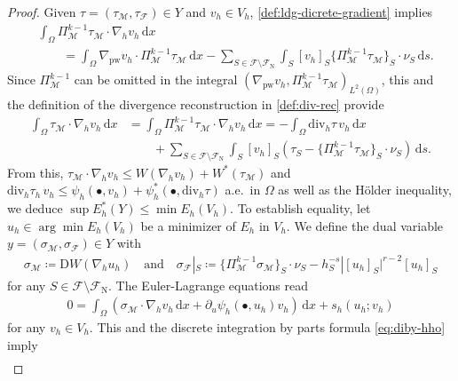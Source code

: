 \documentclass[10pt,a4paper]{amsart}
\newcommand{\D}{\mathrm{D}}
\newcommand{\Mcal}{\mathcal{M}}
\newcommand{\pw}{\mathrm{pw}}
\renewcommand{\div}{\mathrm{div}}
\renewcommand{\d}[1]{\,\mathrm{d}#1}
\begin{document}
\begin{proof}
	Given $\tau = (\tau_\Mcal, \tau_\mathcal{F}) \in Y$ and $v_h \in V_h$,
    \eqref{def:ldg-dicrete-gradient} implies
    \begin{align*}
        &\int_\Omega \Pi_\Mcal^{k-1} \tau_\Mcal \cdot \nabla_h v_h \d{x}\\
        &\qquad= \int_\Omega \nabla_\pw v_h \cdot \Pi_\Mcal^{k-1} \tau_\Mcal \d{x} - \sum_{S \in \mathcal{F}\setminus\mathcal{F}_\mathrm{N}} \int_S [v_h]_S \{\Pi_\Mcal^{k-1} \tau_\Mcal\}_S \cdot \nu_S \d{s}.
    \end{align*}
    Since $\Pi_\Mcal^{k-1}$ can be omitted in the integral $(\nabla_\pw v_h, \Pi_\Mcal^{k-1} \tau_\Mcal)_{L^2(\Omega)}$,
    this and the definition of the divergence reconstruction in \eqref{def:div-rec} provide
    \begin{align}\label{eq:diby-hho}
        \int_\Omega \tau_\Mcal \cdot \nabla_h v_h \d{x} &= \int_\Omega \Pi_\Mcal^{k-1} \tau_\Mcal \cdot \nabla_h v_h \d{x} = -\int_\Omega \div_h \tau \,v_h \d{x}\nonumber\\
		&\qquad+ \sum_{S \in \mathcal{F} \setminus \mathcal{F}_\mathrm{N}} \int_S [v_h]_S (\tau_S - \{\Pi_\Mcal^{k-1} \tau_\Mcal\}_S \cdot \nu_S) \d{s}.
    \end{align}
	From this, $\tau_\Mcal \cdot \nabla_h v_h \leq W(\nabla_h v_h) + W^*(\tau_\Mcal)$ and $\div_h \tau_h \, v_h \leq \psi_h(\bullet,v_h) + \psi_h^*(\bullet,\div_h \tau)$ a.e.~in $\Omega$ as well as the H\"older inequality, we deduce $\sup E_h^*(Y) \leq \min E_h(V_h)$.
    To establish equality,
	let $u_h \in \arg\min E_h(V_h)$ be a minimizer of $E_h$ in $V_h$. We define the dual variable $y = (\sigma_\Mcal, \sigma_\mathcal{F}) \in Y$ with
	\begin{align}\label{def:dual-variable}
			\sigma_\Mcal \coloneqq \D W(\nabla_h u_h) \quad\text{and}\quad
			\sigma_\mathcal{F}|_S \coloneqq \{\Pi_{\Mcal}^{k-1} \sigma_\Mcal\}_S \cdot \nu_S - h_S^{-s}|[u_h]_S|^{r-2} [u_h]_S
	\end{align}
	for any $S \in \mathcal{F}\setminus\mathcal{F}_\mathrm{N}$.
	The Euler-Lagrange equations read
	\begin{align}\label{eq:dELE}
		0 = \int_\Omega (\sigma_\Mcal \cdot \nabla_h v_h \d{x} + \partial_u \psi_h(\bullet, u_h) v_h) \d{x} + s_h(u_h;v_h)
	\end{align}
	for any $v_h \in V_h$.
	This and
	the discrete
	integration by parts formula \eqref{eq:diby-hho} imply
	\begin{align}\label{eq:proof-mldg-equivalence}

\end{align}
\end{proof}
\end{document}
